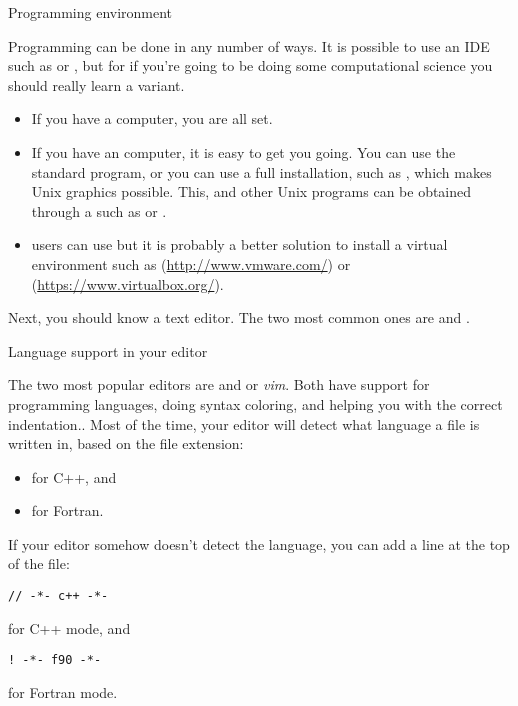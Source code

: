 
 {Programming environment}

Programming can be done in any number of ways. It is possible to use an
\ac{IDE} such as  or , but
for if you're going to be doing some computational science
you should really learn a  variant.
\begin{itemize}
\item If you have a  computer, you are all set.
\item If you have an  computer, it is easy to get you
  going. You can use the standard  program, or you can use a
  full  installation, such as
  , which makes Unix graphics possible.
  This, and other Unix programs can be obtained
  through  a  such as  or .
\item {} users can use
   but it is probably a better solution to install a
  virtual environment such as 
  (\url{http://www.vmware.com/}) or
   (\url{https://www.virtualbox.org/}).
\end{itemize}

Next, you should know a text editor. The two most common ones are
 and .

 {Language support in your editor}
\label{sec:editor-mode}

The two most popular editors are  and 
or \emph{vim}.
Both have support for programming languages, doing syntax coloring,
and helping you with the correct indentation..
Most of the time, your editor will detect what language a
file is written in, based on the file extension:
\begin{itemize}
\item {} for C++, and
\item {} for Fortran.
\end{itemize}
If your editor somehow doesn't detect the language, you can add a line
at the top of the file:
\begin{verbatim}
// -*- c++ -*-
\end{verbatim}
for C++ mode, and 
\begin{verbatim}
! -*- f90 -*-
\end{verbatim}
for Fortran mode.

